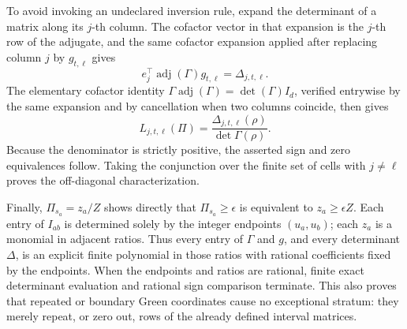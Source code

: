 To avoid invoking an undeclared inversion rule, expand the determinant of a matrix along its \(j\)-th column.  The cofactor vector in that expansion is the \(j\)-th row of the adjugate, and the same cofactor expansion applied after replacing column \(j\) by \(g_{t,\ell}\) gives
\[
 e_j^{\top}\operatorname{adj}(\Gamma)g_{t,\ell}
 =\Delta_{j,t,\ell}.
\]
The elementary cofactor identity \(\Gamma\operatorname{adj}(\Gamma)=\det(\Gamma)I_d\), verified entrywise by the same expansion and by cancellation when two columns coincide, then gives
\[
 L_{j,t,\ell}(\Pi)
 =\frac{\Delta_{j,t,\ell}(\rho)}{\det\Gamma(\rho)}.
\]
Because the denominator is strictly positive, the asserted sign and zero equivalences follow.  Taking the conjunction over the finite set of cells with \(j\ne\ell\) proves the off-diagonal characterization.

Finally, \(\Pi_{s_a}=z_a/Z\) shows directly that \(\Pi_{s_a}\geq\epsilon\) is equivalent to \(z_a\geq\epsilon Z\).  Each entry of \(I_{ab}\) is determined solely by the integer endpoints \((u_a,u_b)\); each \(z_a\) is a monomial in adjacent ratios.  Thus every entry of \(\Gamma\) and \(g\), and every determinant \(\Delta\), is an explicit finite polynomial in those ratios with rational coefficients fixed by the endpoints.  When the endpoints and ratios are rational, finite exact determinant evaluation and rational sign comparison terminate.  This also proves that repeated or boundary Green coordinates cause no exceptional stratum: they merely repeat, or zero out, rows of the already defined interval matrices.
